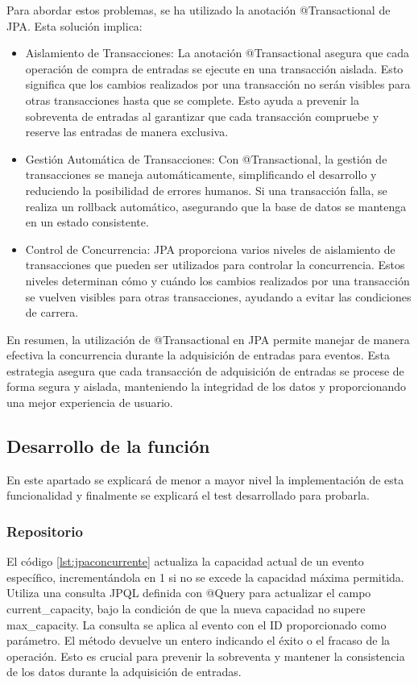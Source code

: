 Para abordar estos problemas, se ha utilizado la anotación @Transactional de JPA. Esta solución implica:
\begin{itemize}
    \item Aislamiento de Transacciones: La anotación @Transactional asegura que cada operación de compra de entradas se ejecute en una transacción aislada. Esto significa
    que los cambios realizados por una transacción no serán visibles para otras transacciones hasta que se complete. Esto ayuda a prevenir la sobreventa de entradas
    al garantizar que cada transacción compruebe y reserve las entradas de manera exclusiva.
    \item Gestión Automática de Transacciones: Con @Transactional, la gestión de transacciones se maneja automáticamente, simplificando el desarrollo y reduciendo la posibilidad
    de errores humanos. Si una transacción falla, se realiza un rollback automático, asegurando que la base de datos se mantenga en un estado consistente.
    \item Control de Concurrencia: JPA proporciona varios niveles de aislamiento de transacciones que pueden ser utilizados para controlar la concurrencia. Estos niveles determinan
    cómo y cuándo los cambios realizados por una transacción se vuelven visibles para otras transacciones, ayudando a evitar las condiciones de carrera.
\end{itemize}

En resumen, la utilización de @Transactional en JPA permite manejar de manera efectiva la concurrencia durante la adquisición de entradas para eventos. Esta estrategia
asegura que cada transacción de adquisición de entradas se procese de forma segura y aislada, manteniendo la integridad de los datos y proporcionando una mejor experiencia de
usuario.

\subsection{Desarrollo de la función}
En este apartado se explicará de menor a mayor nivel la implementación de esta funcionalidad y finalmente se explicará el test desarrollado para probarla.

\subsubsection*{Repositorio}
El código \ref{lst:jpaconcurrente} actualiza la capacidad actual de un evento específico, incrementándola en 1 si no se excede la capacidad máxima permitida. 
Utiliza una consulta JPQL definida con @Query para actualizar el campo current\_capacity, bajo la condición de que la nueva capacidad no supere max\_capacity. 
La consulta se aplica al evento con el ID proporcionado como parámetro. El método devuelve un entero indicando el éxito o el fracaso de la operación. Esto es crucial para
prevenir la sobreventa y mantener la consistencia de los datos durante la adquisición de entradas.

